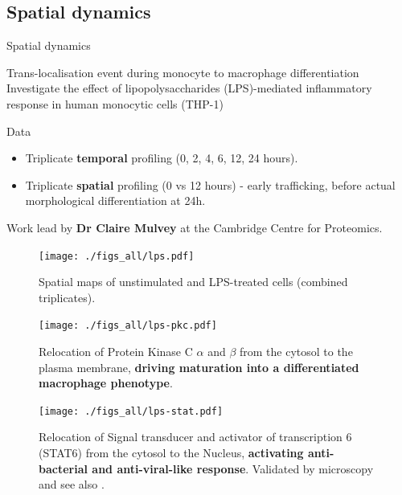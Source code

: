 \subsection{Spatial dynamics}

\begin{frame}{Spatial dynamics}
  \begin{block}{Trans-localisation event during monocyte to macrophage
      differentiation}
    Investigate the effect of lipopolysaccharides (LPS)-mediated
    inflammatory response in human monocytic cells (THP-1)
  \end{block}

  \begin{block}{Data}
    \begin{itemize}
    \item Triplicate \textbf{temporal} profiling (0, 2, 4, 6, 12, 24
      hours).
    \item Triplicate \textbf{spatial} profiling (0 vs 12 hours) -
      early trafficking, before actual morphological differentiation
      at 24h.
    \end{itemize}
  \end{block}

  Work lead by \textbf{Dr Claire Mulvey} at the Cambridge Centre for
  Proteomics.

\end{frame}



\begin{frame}
  \begin{figure}[h]
    \centering
    \texttt{[image: ./figs\_all/lps.pdf]}
    \caption{Spatial maps of unstimulated and LPS-treated cells
      (combined triplicates).}
  \end{figure}
\end{frame}

\begin{frame}
  \begin{figure}[h]
    \centering
    \texttt{[image: ./figs\_all/lps-pkc.pdf]}
    \caption{Relocation of Protein Kinase C $\alpha$ and $\beta$ from the
      cytosol to the plasma membrane, \textbf{driving maturation into
        a differentiated macrophage phenotype}.}
  \end{figure}
\end{frame}

\begin{frame}
  \begin{figure}[h]
    \centering
    \texttt{[image: ./figs\_all/lps-stat.pdf]}
    \caption{Relocation of Signal transducer and activator of
      transcription 6 (STAT6) from the cytosol to the Nucleus,
      \textbf{activating anti-bacterial and anti-viral-like
        response}. Validated by microscopy and see also
      \cite{Chen:2011}.}
  \end{figure}
\end{frame}
